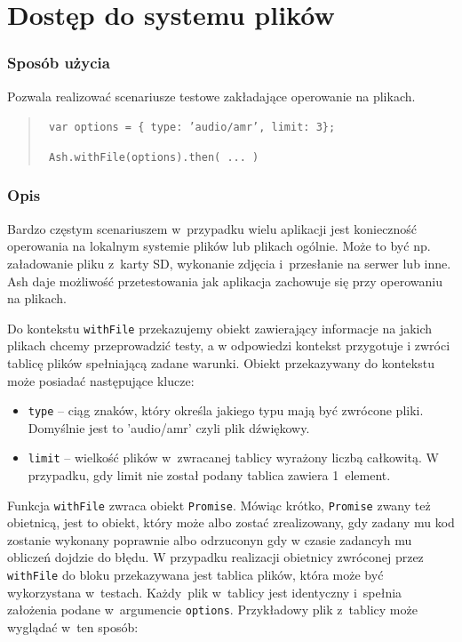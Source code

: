 \documentclass[brudnopis]{xmgr}
\begin{document}
\section{Dostęp do systemu plików}

\subsubsection{Sposób użycia}
Pozwala realizować scenariusze testowe zakładające operowanie na plikach.

\begin{quote}
  \texttt{  var options = \{ type: 'audio/amr', limit: 3\};  }

  \texttt{  Ash.withFile(options).then( ... )  }
\end{quote}

\subsubsection{Opis}

Bardzo częstym scenariuszem w~przypadku wielu aplikacji jest konieczność operowania na lokalnym systemie plików lub plikach ogólnie. Może to być np. załadowanie pliku z~karty SD, wykonanie zdjęcia i~przesłanie na serwer lub inne. Ash daje możliwość przetestowania jak aplikacja zachowuje się przy operowaniu na plikach.  

Do kontekstu \texttt{withFile} przekazujemy obiekt zawierający informacje na jakich plikach chcemy przeprowadzić testy, a w odpowiedzi kontekst przygotuje i zwróci tablicę plików spełniającą zadane warunki. Obiekt przekazywany do kontekstu może posiadać następujące klucze:

\begin{itemize}
  \item \texttt{type} -- ciąg znaków, który określa jakiego typu mają być zwrócone pliki. Domyślnie jest to 'audio/amr' czyli plik dźwiękowy. 
  \item \texttt{limit} -- wielkość plików w~zwracanej tablicy wyrażony liczbą całkowitą. W przypadku, gdy limit nie został podany tablica zawiera 1~element. 
\end{itemize}

Funkcja \texttt{withFile} zwraca obiekt \texttt{Promise}. Mówiąc krótko, \texttt{Promise} zwany też obietnicą, jest to obiekt, który może albo zostać zrealizowany, gdy zadany mu kod zostanie wykonany poprawnie albo odrzuconyn gdy w czasie zadancyh mu obliczeń dojdzie do błędu.  W przypadku realizacji obietnicy zwróconej przez \texttt{withFile} do bloku przekazywana jest tablica plików, która może być wykorzystana w~testach. Każdy~plik w~tablicy jest identyczny i~spełnia założenia podane w~argumencie \texttt{options}. Przykładowy plik z~tablicy może wyglądać w~ten sposób:
\end{document}
